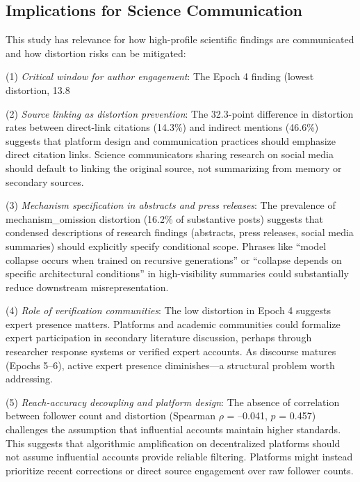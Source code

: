 \documentclass[twocolumn,11pt]{article}
\begin{document}
\subsection{Implications for Science Communication}

This study has relevance for how high-profile scientific findings are communicated and how distortion risks can be mitigated:

(1) \textit{Critical window for author engagement}: The Epoch 4 finding (lowest distortion, 13.8%

(2) \textit{Source linking as distortion prevention}: The 32.3-point difference in distortion rates between direct-link citations (14.3\%) and indirect mentions (46.6\%) suggests that platform design and communication practices should emphasize direct citation links. Science communicators sharing research on social media should default to linking the original source, not summarizing from memory or secondary sources.

(3) \textit{Mechanism specification in abstracts and press releases}: The prevalence of mechanism\_omission distortion (16.2\% of substantive posts) suggests that condensed descriptions of research findings (abstracts, press releases, social media summaries) should explicitly specify conditional scope. Phrases like ``model collapse occurs when trained on recursive generations'' or ``collapse depends on specific architectural conditions'' in high-visibility summaries could substantially reduce downstream misrepresentation.

(4) \textit{Role of verification communities}: The low distortion in Epoch 4 suggests expert presence matters. Platforms and academic communities could formalize expert participation in secondary literature discussion, perhaps through researcher response systems or verified expert accounts. As discourse matures (Epochs 5--6), active expert presence diminishes—a structural problem worth addressing.

(5) \textit{Reach-accuracy decoupling and platform design}: The absence of correlation between follower count and distortion (Spearman $\rho$ = --0.041, $p$ = 0.457) challenges the assumption that influential accounts maintain higher standards. This suggests that algorithmic amplification on decentralized platforms should not assume influential accounts provide reliable filtering. Platforms might instead prioritize recent corrections or direct source engagement over raw follower counts.
\end{document}
